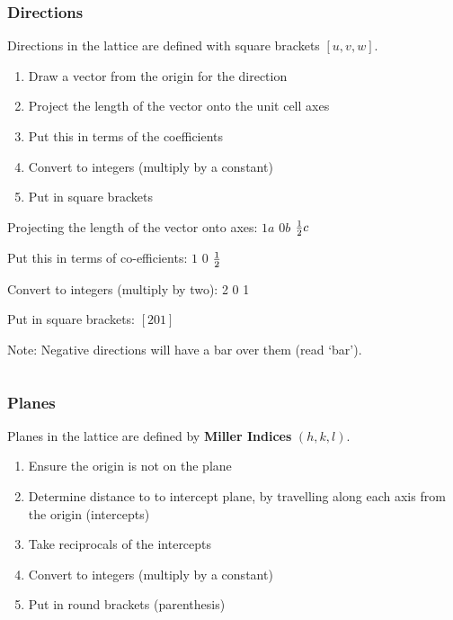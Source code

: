 \documentclass[12pt]{article}
\begin{document}
\subsubsection{Directions}
Directions in the lattice are defined with square brackets $[u,v,w]$.

\begin{enumerate}
  \item Draw a vector from the origin for the direction 
  \item Project the length of the vector onto the unit cell axes 
  \item Put this in terms of the coefficients 
  \item Convert to integers (multiply by a constant)
  \item Put in square brackets 
\end{enumerate}

\begin{example}
  Projecting the length of the vector onto axes:
  $1a$ $0b$ $\frac{1}{2} c$

  Put this in terms of co-efficients:
  $1$ $0$ $\frac{1}{2}$

  Convert to integers (multiply by two):
  2 0 1

  Put in square brackets:
  $[201]$
\end{example}

Note: Negative directions will have a bar over them (read `bar').  

\begin{equation*}
[1\bar{1}0]
\end{equation*}

\subsubsection{Planes}
Planes in the lattice are defined by \textbf{Miller Indices} $(h,k,l)$.

\begin{enumerate}
  \item Ensure the origin is not on the plane 
  \item Determine distance to to intercept plane, by travelling along each axis from the origin (intercepts)
  \item Take reciprocals of the intercepts 
  \item Convert to integers (multiply by a constant)
  \item Put in round brackets (parenthesis)
\end{enumerate}
\end{document}
